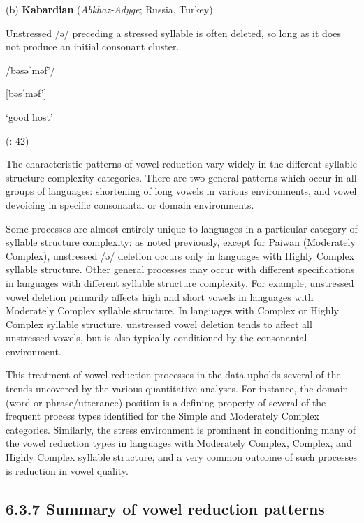 (b)  \textbf{Kabardian} (\textit{Abkhaz-Adyge}; Russia, Turkey) 



Unstressed /ə/ preceding a stressed syllable is often deleted, so long as it does not produce an initial consonant cluster.



/bəsəˈməf’/



[bəsˈməf’]



‘good host’



(\citealt{GordonApplebaum2010}: 42)
\z



  The characteristic patterns of vowel reduction vary widely in the different syllable structure complexity categories. There are two general patterns which occur in all groups of languages: shortening of long vowels in various environments, and vowel devoicing in specific consonantal or domain environments. 



  Some processes are almost entirely unique to languages in a particular category of syllable structure complexity: as noted previously, except for Paiwan (Moderately Complex), unstressed /ə/ deletion occurs only in languages with Highly Complex syllable structure. Other general processes may occur with different specifications in languages with different syllable structure complexity. For example, unstressed vowel deletion primarily affects high and short vowels in languages with Moderately Complex syllable structure. In languages with Complex or Highly Complex syllable structure, unstressed vowel deletion tends to affect all unstressed vowels, but is also typically conditioned by the consonantal environment.



  This treatment of vowel reduction processes in the data upholds several of the trends uncovered by the various quantitative analyses. For instance, the domain (word or phrase/utterance) position is a defining property of several of the frequent process types identified for the Simple and Moderately Complex categories. Similarly, the stress environment is prominent in conditioning many of the vowel reduction types in languages with Moderately Complex, Complex, and Highly Complex syllable structure, and a very common outcome of such processes is reduction in vowel quality.


\subsection{6.3.7 Summary of vowel reduction patterns}

